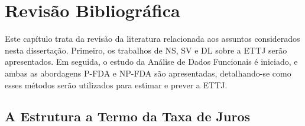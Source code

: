 \documentclass[
	12pt,				%
	openright,			%
	oneside,			%
	a4paper,			%
	english,			%
	brazil				%
	]{dissertacao-ufrgs-abntex2}
\begin{document}
%
%
%


\chapter{Revisão Bibliográfica} \label{ch:revisao-biblio}

Este capítulo trata da revisão da literatura relacionada aos assuntos considerados nesta dissertação. Primeiro, os trabalhos de NS, SV e DL sobre a ETTJ serão apresentados. Em seguida, o estudo da Análise de Dados Funcionais é iniciado, e ambas as abordagens P-FDA e NP-FDA são apresentadas, detalhando-se como esses métodos serão utilizados para estimar e prever a ETTJ. 

\section{A Estrutura a Termo da Taxa de Juros}
\end{document}
